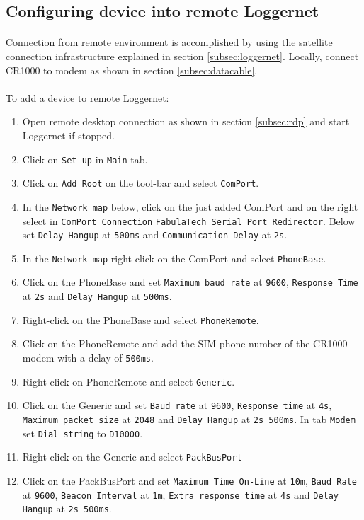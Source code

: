 \subsection{Configuring device into remote Loggernet}
\paragraph{}
Connection from remote environment is accomplished by using the satellite connection infrastructure explained in section \ref{subsec:loggernet}.
Locally, connect CR1000 to modem as shown in section \ref{subsec:datacable}.
\paragraph{}
To add a device to remote Loggernet:
\begin{enumerate}
	\item Open remote desktop connection as shown in section \ref{subsec:rdp} and start Loggernet if stopped.
	\item Click on {\tt Set-up} in {\tt Main} tab.
	\item Click on {\tt Add Root} on the tool-bar and select {\tt ComPort}.
	\item In the {\tt Network map} below, click on the just added ComPort and on the right select in {\tt ComPort Connection} {\tt FabulaTech Serial Port Redirector}. Below set {\tt Delay Hangup} at {\tt 500ms} and {\tt Communication Delay} at {\tt 2s}.
	\item In the {\tt Network map} right-click on the ComPort and select {\tt PhoneBase}.
	\item Click on the PhoneBase  and set {\tt Maximum baud rate} at {\tt 9600}, {\tt Response Time} at {\tt 2s} and {\tt Delay Hangup} at {\tt 500ms}.
	\item Right-click on the PhoneBase and select {\tt PhoneRemote}.
	\item Click on the PhoneRemote  and add the SIM phone number of the CR1000 modem with a delay of {\tt 500ms}.
	\item Right-click on PhoneRemote and select {\tt Generic}.
	\item Click on the Generic  and set {\tt Baud rate} at {\tt 9600}, {\tt Response time} at {\tt 4s}, {\tt Maximum packet size} at {\tt 2048} and {\tt Delay Hangup} at {\tt 2s 500ms}. In tab {\tt Modem} set {\tt Dial string} to {\tt D10000}.
	\item Right-click on the Generic and select {\tt PackBusPort}
	\item Click on the PackBusPort and set {\tt Maximum Time On-Line} at {\tt 10m}, {\tt Baud Rate} at {\tt 9600}, {\tt Beacon Interval} at {\tt 1m}, {\tt Extra response time} at {\tt 4s} and {\tt Delay Hangup} at {\tt 2s 500ms}.

\end{enumerate}
